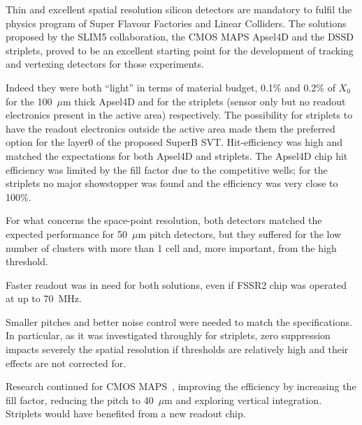  Thin and excellent spatial resolution silicon detectors are mandatory to fulfil the physics program 
 of Super Flavour Factories and Linear Colliders. 
 The solutions proposed by the SLIM5 collaboration, the CMOS MAPS Apsel4D and the DSSD 
 striplets, proved to be an excellent starting point for the development of tracking and vertexing 
 detectors for those experiments. 
 
 Indeed they were both ``light'' in terms of material budget, 0.1\% and 0.2\% of $X_0$ for the 
 100~$\mu$m thick Apsel4D and for the striplets (sensor only but no readout electronics present in 
 the active area) respectively. The possibility for striplets to have the readout electronics outside 
 the active area made them the preferred option for the layer0 of the proposed SuperB SVT.
 Hit-efficiency was high and matched the expectations for both Apsel4D and striplets. The 
 Apsel4D chip hit efficiency was limited by the fill factor due to the competitive wells; 
 for the striplets no major showstopper was found and the efficiency was very close to 100\%.

 For what concerns 
 the space-point resolution, both detectors matched the expected performance for  50~$\mu$m pitch 
 detectors, 
 but they suffered for the low number of clusters with more than 1 cell and, more important, 
 from the high threshold. 
  
  Faster readout was in need for both solutions, even if FSSR2 chip was operated at up to 
  70~MHz.
  
 Smaller pitches and better noise control were needed to 
 match the specifications. In particular, as it was investigated throughly for striplets, zero suppression 
 impacts severely the spatial resolution if thresholds are relatively high and their effects are not 
 corrected for. 
 
 Research continued for CMOS MAPS~\cite{Rizzo:2013aza}, improving the efficiency by increasing 
 the fill factor, reducing the pitch to 40~$\mu$m and exploring vertical integration. 
 Striplets would have benefited from a new readout chip.

